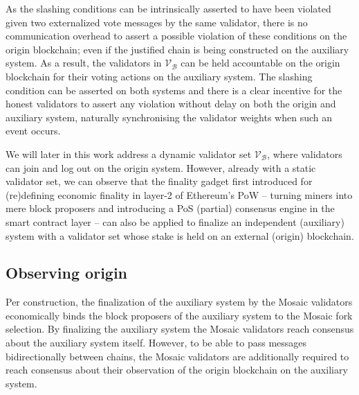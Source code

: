 \documentclass[12pt,a4paper]{article}
\begin{document}
As the slashing conditions can be intrinsically asserted to have been violated given two externalized vote messages by the same validator, there is no communication overhead to assert a possible violation of these conditions on the origin blockchain; even if the justified chain is being constructed on the auxiliary system.
As a result, the validators in $\mathcal{V}_\mathcal{B}$ can be held accountable on the origin blockchain for their voting actions on the auxiliary system.
The slashing condition can be asserted on both systems and there is a clear incentive for the honest validators to assert any violation without delay on both the origin and auxiliary system, naturally synchronising the validator weights when such an event occurs.

We will later in this work address a dynamic validator set $\mathcal{V}_\mathcal{B}$, where validators can join and log out on the origin system.
However, already with a static validator set, we can observe that the finality gadget first introduced for (re)defining economic finality in layer-2 of Ethereum's PoW -- turning miners into mere block proposers and introducing a PoS (partial) consensus engine in the smart contract layer -- can also be applied to finalize an independent (auxiliary) system with a validator set whose stake is held on an external (origin) blockchain.


\subsection{Observing origin}
\label{observing_origin}

Per construction, the finalization of the auxiliary system by the Mosaic validators economically binds the block proposers of the auxiliary system to the Mosaic fork selection.
By finalizing the auxiliary system the Mosaic validators reach consensus about the auxiliary system itself.
However, to be able to pass messages bidirectionally between chains, the Mosaic validators are additionally required to reach consensus about their observation of the origin blockchain on the auxiliary system.
\end{document}
